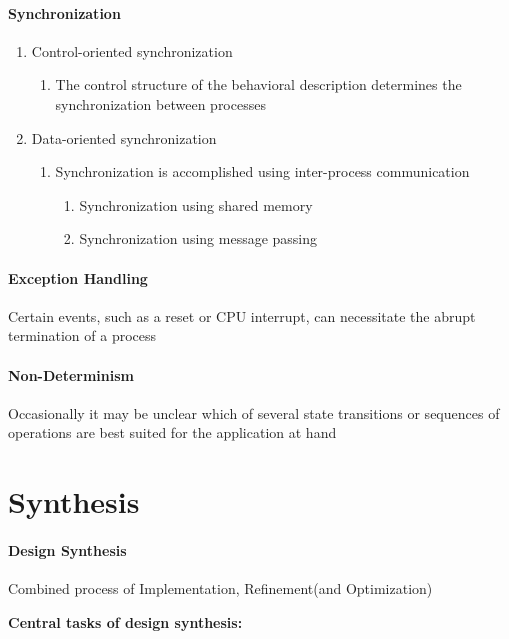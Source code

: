 \documentclass[english]{latex4ei/latex4ei_sheet}
\begin{document}
\paragraph{Synchronization}
\begin{enumerate}
  \item Control-oriented synchronization
    \begin{enumerate}
    	\item The control structure of the behavioral description determines the synchronization between processes
    \end{enumerate}
  \item Data-oriented synchronization
    \begin{enumerate}
    	\item Synchronization is accomplished using inter-process communication
	  \begin{enumerate}
	    \item Synchronization using shared memory
	    \item Synchronization using message passing
	  \end{enumerate}
    \end{enumerate}
\end{enumerate}
 
\paragraph{Exception Handling} Certain events, such as a reset or CPU interrupt, can necessitate the abrupt termination of a process

\paragraph{Non-Determinism} Occasionally it may be unclear which of several state transitions or
sequences of operations are best suited for the application at hand

\section{Synthesis}

\paragraph{Design Synthesis} 
Combined process of Implementation, Refinement(and Optimization)

\textbf{Central tasks of design synthesis:}
\end{document}
